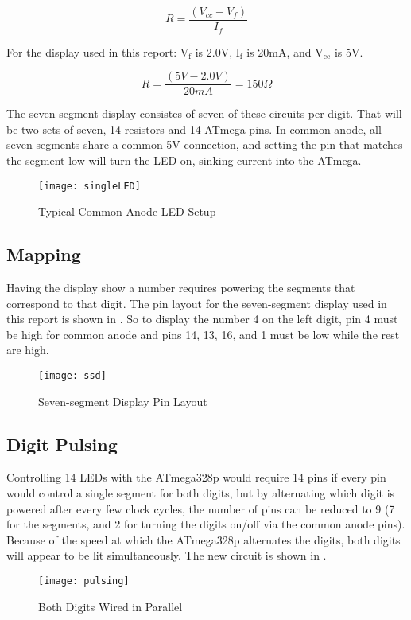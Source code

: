 \documentclass[main.tex]{subfiles}
\begin{document}
			\[
				R = \frac{\left(V_{cc} - V_f\right)}{I_f}
			\]
		
		For the display used in this report: V$_{\text{f}}$ is 2.0V, I$_{\text{f}}$ is 20mA, and 
		V$_{\text{cc}}$ is 5V.
		
		
			\[
				R = \frac{\left(5V - 2.0V\right)}{20mA} = 150 \Omega
			\]
		
		The seven-segment display consistes of seven of these circuits per digit. That will be two sets
		of seven, 14 resistors and 14 ATmega pins. In common anode, all seven segments share a common 
		5V connection, and setting the pin that matches the segment low will turn the LED on, sinking
		current into the ATmega.
		\begin{figure}[H]
			\begin{center}
				\texttt{[image: singleLED]}
			\end{center}
			\caption{Typical Common Anode LED Setup}
			\label{fig:led}
		\end{figure}
				
		
		\subsection{Mapping}
		Having the display show a number requires powering the segments that correspond to that digit.
		The pin layout for the seven-segment display used in this report is shown in .
		So to display the number 4 on the left digit, pin 4 must be high for common anode and pins
		14, 13, 16, and 1 must be low while the rest are high.
		\begin{figure}[H]
			\begin{center}
				\texttt{[image: ssd]}
			\end{center}
			\caption{Seven-segment Display Pin Layout}
			\label{fig:seven}
		\end{figure}
		
		\subsection{Digit Pulsing}
		Controlling 14 LEDs with the ATmega328p would require 14 pins if every pin would control a single
		segment for both digits, but by alternating which digit is powered after every few clock cycles,
		the number of pins can be reduced to 9 (7 for the segments, and 2 for turning the digits on/off
		via the common anode pins). Because of the speed at which the ATmega328p alternates the digits,
		both digits will appear to be lit simultaneously. The new circuit is shown in .
		\begin{figure}[H]
			\begin{center}
				\texttt{[image: pulsing]}
			\end{center}
			\caption{Both Digits Wired in Parallel}
			\label{fig:pulse}
		\end{figure}
		
\end{document}
